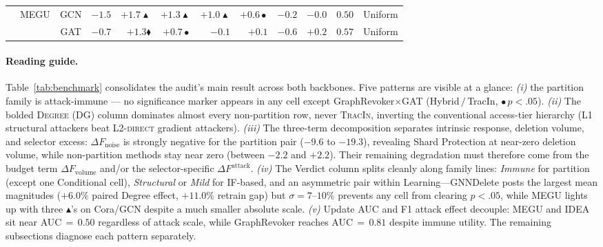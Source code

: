 \begin{table}[t]
\begin{tabular}{@{}llcrrrrrrrcl@{}}
 & \multirow{2}{*}{MEGU}         & GCN & $-1.5$ & $\mathbf{+1.7}\blacktriangle$ & $+1.3\blacktriangle$ & $+1.0\blacktriangle$ & $+0.6\bullet$        & $-0.2$                       & $-0.0$  & $0.50$ & Uniform \\
 &                               & GAT & $-0.7$ & $\mathbf{+1.3}\blacklozenge$ & $+0.7\bullet$        & $-0.1$               & $+0.1$               & $-0.6$                       & $+0.2$  & $0.57$ & Uniform \\
\bottomrule
\end{tabular}
\end{table}

\paragraph{Reading guide.}
Table~\ref{tab:benchmark} consolidates the audit's main result across
both backbones. Five patterns are visible at a glance: \emph{(i)} the
partition family is attack-immune --- no significance marker appears
in any cell except GraphRevoker$\times$GAT (Hybrid$\,/\,$TracIn,
$\bullet\,p{<}.05$). \emph{(ii)} The bolded \textsc{Degree} (DG)
column dominates almost every non-partition row, never
\textsc{TracIn}, inverting the conventional access-tier hierarchy
(L1 structural attackers beat L2-\textsc{direct} gradient attackers). \emph{(iii)} The
three-term decomposition separates intrinsic response, deletion volume,
and selector excess: $\Delta F_{\mathrm{noise}}$ is strongly negative
for the partition pair ($-9.6$ to $-19.3$), revealing Shard Protection
at near-zero deletion volume, while non-partition methods stay near
zero (between $-2.2$ and $+2.2$). Their remaining degradation must
therefore come from the budget term $\Delta F_{\mathrm{volume}}$ and/or
the selector-specific $\Delta F^{\mathrm{attack}}$. \emph{(iv)} The Verdict column splits
cleanly along family lines: \emph{Immune} for partition (except one
Conditional cell), \emph{Structural} or \emph{Mild} for IF-based,
and an asymmetric pair within Learning---GNNDelete posts the largest
mean magnitudes ($+6.0\%$ paired Degree effect, $+11.0\%$ retrain
gap) but $\sigma{=}7$--$10\%$ prevents any cell from clearing
$p{<}.05$, while MEGU lights up with three $\blacktriangle$'s on
Cora/GCN despite a much smaller absolute scale. \emph{(v)} Update AUC and F1 attack effect decouple:
MEGU and IDEA sit near AUC$\,{=}\,0.50$ regardless of attack scale,
while GraphRevoker reaches AUC${\,=\,}0.81$ despite immune utility.
The remaining subsections diagnose each pattern separately.

